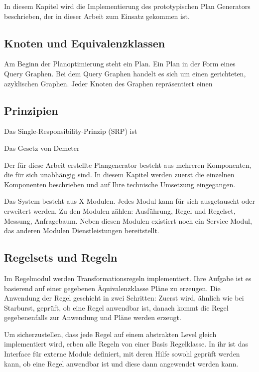 In diesem Kapitel wird die Implementierung des prototypischen Plan Generators beschrieben, der in dieser Arbeit zum Einsatz gekommen ist.

\subsection{Knoten und Equivalenzklassen}

Am Beginn der Planoptimierung steht ein Plan. Ein Plan in der Form eines Query Graphen. Bei dem Query Graphen handelt es sich um einen gerichteten, azyklischen Graphen. Jeder Knoten des Graphen repräsentiert einen 

\subsection{Prinzipien}

Das  Single-Responsibility-Prinzip (SRP) ist 

Das Gesetz von Demeter




Der für diese Arbeit erstellte Plangenerator besteht aus mehreren Komponenten, die für sich unabhängig sind. In diesem Kapitel werden zuerst die einzelnen Komponenten beschrieben und auf Ihre technische Umsetzung eingegangen.


Das System besteht aus X Modulen. Jedes Modul kann für sich ausgetauscht oder erweitert werden. Zu den Modulen zählen: Ausführung, Regel und Regelset, Messung, Anfragebaum. Neben diesen Modulen existiert noch ein Service Modul, das anderen Modulen Dienstleistungen bereitstellt.

\subsection{Regelsets und Regeln}

Im Regelmodul werden Transformationsregeln implementiert. Ihre Aufgabe ist es basierend auf einer gegebenen Äquivalenzklasse Pläne zu erzeugen. Die Anwendung der Regel geschieht in zwei Schritten: Zuerst  wird, ähnlich wie bei Starburst, geprüft, ob eine Regel anwendbar ist, danach kommt die Regel gegebenenfalls zur Anwendung und Pläne werden erzeugt.

Um sicherzustellen, dass jede Regel auf einem abstrakten Level gleich implementiert wird, erben alle Regeln von einer Basis Regelklasse. In ihr ist das Interface für externe Module definiert, mit deren Hilfe sowohl geprüft werden kann, ob eine Regel anwendbar ist und diese dann angewendet werden kann.


